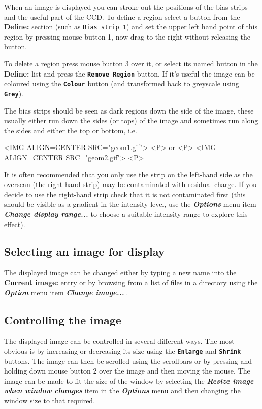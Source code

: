 \documentclass[11pt]{article}
\newcommand{\xlabel}[1]{}
\newcommand{\butt}[1]{{\bf \tt #1}}
\newcommand{\menu}[1]{{\bf \em #1}}
\newcommand{\wlab}[1]{{\bf #1}}
\newcommand{\text}[1]{{\tt #1}}
\begin{document}
When an image is displayed you can stroke out the positions of the
bias strips and the useful part of the CCD. To define a region select
a button from the \wlab{Define:} section (such as \text{Bias strip 1})
and set the upper left hand point of this region by pressing mouse
button 1, now drag to the right without releasing the button.

To delete a region press mouse button 3 over it, or select its named
button in the \wlab{Define:} list and press the \butt{Remove Region}
button. If it's useful the image can be coloured using the
\butt{Colour} button (and transformed back to greyscale using \butt{Grey}).

The bias strips should be seen as dark regions down the side of the
image, these usually either run down the sides (or tops) of the image
and sometimes run along the sides and either the top or bottom, i.e.

\begin{rawhtml}
<IMG ALIGN=CENTER SRC="geom1.gif">
<P>
or
<P>
<IMG ALIGN=CENTER SRC="geom2.gif">
<P>
\end{rawhtml}

It is often recommended that you only use the strip on the left-hand
side as the overscan (the right-hand strip) may be contaminated with
residual charge. If you decide to use the right-hand strip check that
it is not contaminated first (this should be visible as a gradient in
the intensity level, use the \menu{Options} menu item
\menu{Change display range...} to choose a suitable intensity range
to explore this effect).

\subsection{Selecting an image for display \xlabel{CCDGeometryNDF}}
The displayed image can be changed either by typing a new name into
the \wlab{Current image:} entry or by browsing from a list of files in a
directory using the \menu{Option} menu item \menu{Change image...}\,.

\subsection{Controlling the image \xlabel{CCDGeometryGwm}}
The displayed image can be controlled in several different ways. The
most obvious is by increasing or decreasing its size using the
\butt{Enlarge} and \butt{Shrink} buttons. The image can then be
scrolled using the scrollbars or by pressing and holding down mouse
button 2 over the image and then moving the mouse. The image can be
made to fit the size of the window by selecting the \menu{Resize image
when window changes} item in the \menu{Options} menu and then
changing the window size to that required.
\end{document}
